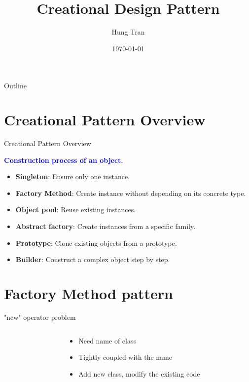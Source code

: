 \documentclass[13pt]{beamer}
\title[Design Pattern]{Creational Design Pattern}
\author{Hung Tran}
\institute{Fpt software}
\date{\today}
\begin{document}
\begin{frame}
  \titlepage
\end{frame}

\begin{frame}{Outline}
  \tableofcontents
\end{frame}

\section{Creational Pattern Overview}

\begin{frame}{Creational Pattern Overview}
	\begin{center}
	\textcolor{blue}{\textbf{Construction process of an object.}}
	\end{center}
	\begin{itemize}
		\setlength\itemsep{1em}
		\item \textbf{Singleton}: Ensure only one instance.
		\item \textbf{Factory Method}: Create instance without depending on its concrete type.
		\item \textbf{Object pool}: Reuse existing instances.
		\item \textbf{Abstract factory}: Create instances from a specific family.
		\item \textbf{Prototype}: Clone existing objects from a prototype.
		\item \textbf{Builder}: Construct a complex object step by step.
	\end{itemize}
\end{frame}

\section{Factory Method pattern}

\begin{frame}{"new" operator problem}
\begin{columns}[T]
\begin{column}{.48\textwidth}
\lstset{basicstyle=\tiny,style=myCustomCppStyle}

\end{column}
\begin{column}{.48\textwidth}
	\begin{itemize}
		\setlength\itemsep{1em}
		\item Need name of class
		\item Tightly coupled with the name
		\item Add new class, modify the existing code
	\end{itemize}
\end{column}
\end{columns}
\end{frame}
\end{document}

